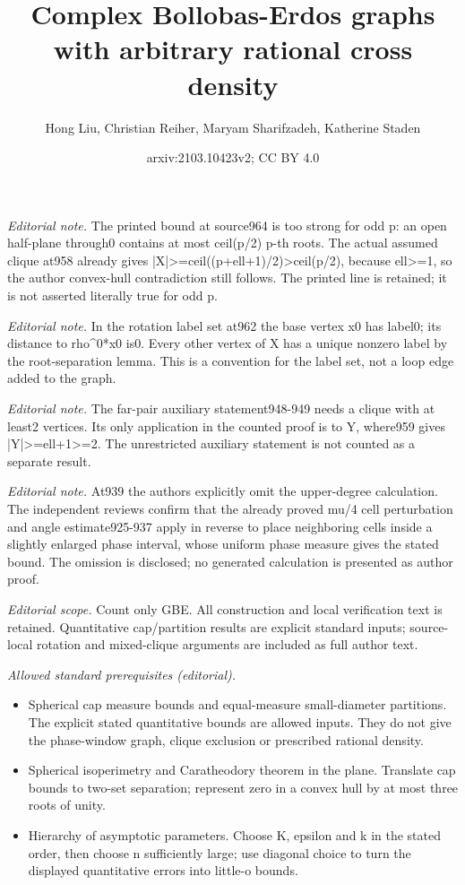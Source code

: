 \documentclass[10pt,a4paper]{article}
\title{Complex Bollobas-Erdos graphs with arbitrary rational cross density}
\author{Hong Liu, Christian Reiher, Maryam Sharifzadeh, Katherine Staden}
\date{arxiv:2103.10423v2; CC BY 4.0}
\theoremstyle{definition}
\begin{document}
\maketitle
\noindent\textit{Editorial note.} The printed bound at source964 is too strong for odd p: an open half-plane through0 contains at most ceil(p/2) p-th roots. The actual assumed clique at958 already gives |X|>=ceil((p+ell+1)/2)>ceil(p/2), because ell>=1, so the author convex-hull contradiction still follows. The printed line is retained; it is not asserted literally true for odd p.\par\medskip
\noindent\textit{Editorial note.} In the rotation label set at962 the base vertex x0 has label0; its distance to rho\textasciicircum{}0*x0 is0. Every other vertex of X has a unique nonzero label by the root-separation lemma. This is a convention for the label set, not a loop edge added to the graph.\par\medskip
\noindent\textit{Editorial note.} The far-pair auxiliary statement948-949 needs a clique with at least2 vertices. Its only application in the counted proof is to Y, where959 gives |Y|>=ell+1>=2. The unrestricted auxiliary statement is not counted as a separate result.\par\medskip
\noindent\textit{Editorial note.} At939 the authors explicitly omit the upper-degree calculation. The independent reviews confirm that the already proved mu/4 cell perturbation and angle estimate925-937 apply in reverse to place neighboring cells inside a slightly enlarged phase interval, whose uniform phase measure gives the stated bound. The omission is disclosed; no generated calculation is presented as author proof.\par\medskip
\noindent\textit{Editorial scope.} Count only GBE. All construction and local verification text is retained. Quantitative cap/partition results are explicit standard inputs; source-local rotation and mixed-clique arguments are included as full author text.\par\medskip
\noindent\textit{Allowed standard prerequisites (editorial).}\begin{itemize}
\item Spherical cap measure bounds and equal-measure small-diameter partitions. The explicit stated quantitative bounds are allowed inputs. They do not give the phase-window graph, clique exclusion or prescribed rational density.
\item Spherical isoperimetry and Caratheodory theorem in the plane. Translate cap bounds to two-set separation; represent zero in a convex hull by at most three roots of unity.
\item Hierarchy of asymptotic parameters. Choose K, epsilon and k in the stated order, then choose n sufficiently large; use diagonal choice to turn the displayed quantitative errors into little-o bounds.
\end{itemize}\medskip
\end{document}

